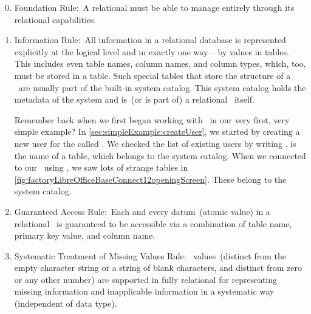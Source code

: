 \begin{enumerate}%
\setcounter{enumi}{-1}%
%
\item Foundation Rule:~A relational  must be able to manage  entirely through its relational capabilities.%
%
\item Information Rule:~All information in a relational database is represented explicitly at the logical level and in exactly one way -- by values in tables.
This includes even table names, column names, and column types, which, too, must be stored in a table.
Such special tables that store the structure of a \db\ are usually part of the built-in system catalog.
This system catalog holds the metadata of the system and is~(or is part of) a relational \db\ itself.

Remember back when we first began working with \postgresql\ in our very first, very simple example?
In \cref{sec:simpleExample:createUser}, we started by creating a new user for the  called .
We checked the list of existing users by writing .
 is the name of a table, which belongs to the system catalog.
When we connected to our \db\ using \libreofficeBase, we saw lots of strange tables in \cref{fig:factoryLibreOfficeBaseConnect12openingScreen}.
These belong to the system catalog.%
%
\item Guaranteed Access Rule:~Each and every datum~(atomic value) in a relational \db\ is guaranteed to be accessible via a combination of table name, primary key value, and column name.%
%
\item Systematic Treatment of Missing Values Rule:~ values~(distinct from the empty character string or a string of blank characters, and distinct from zero or any other number) are supported in fully relational  for representing missing information and inapplicable information in a systematic way (independent of data type).


\end{enumerate}
